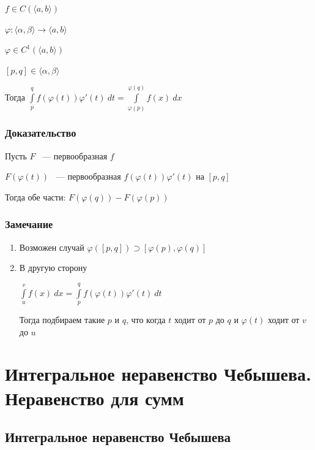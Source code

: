 \documentclass{article}
\begin{document}
                $f \in C(\langle a, b \rangle)$

                $\varphi : \langle \alpha, \beta \rangle \rightarrow \langle a, b \rangle$

                $\varphi \in C^1 (\langle a, b \rangle)$

                $[p, q] \in \langle \alpha, \beta \rangle$

                Тогда $\int\limits^q_p f(\varphi(t))\varphi'(t) \ dt = \int\limits^{\varphi(q)}_{\varphi(p)} f(x) \ dx$

			\subsubsection{Доказательство}

                Пусть $F$ ~--- первообразная $f$
	
                $F(\varphi(t))$ ~--- первообразная $f(\varphi(t))\varphi'(t)$ на $[p, q]$

                Тогда обе части: $F(\varphi(q)) - F(\varphi(p))$

			\subsubsection{Замечание}

			\begin{enumerate}

				\item Возможен случай $\varphi([p, q]) \supset [\varphi(p), \varphi(q)]$

				\item В другую сторону

					$\int\limits^v_u f(x) \ dx = \int\limits^q_p f(\varphi(t))\varphi'(t) \ dt$

					Тогда подбираем такие $p$ и $q$, что когда $t$ ходит от $p$ до $q$ и $\varphi(t)$ ходит от $v$ до $u$

			\end{enumerate}
	\newpage
	
	\section{Интегральное неравенство Чебышева. Неравенство для сумм}
	
		\subsection{Интегральное неравенство Чебышева}
		
\end{document}
